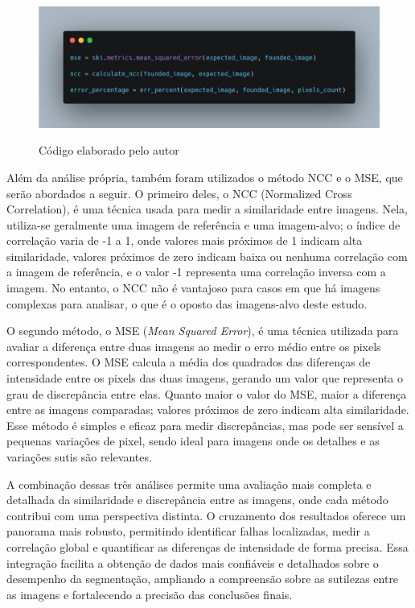 \FloatBarrier
\begin{figure}[ht]
    \caption{Código elaborado pelo autor}
    \centering
    \includegraphics[scale=0.25]{imagens/code_part_three.png}
    \label{fig:code3}
\end{figure}
\FloatBarrier

Além da análise própria, também foram utilizados o método NCC e o MSE, que serão abordados a seguir. O primeiro deles, o NCC (Normalized Cross Correlation), é uma técnica usada para medir a similaridade entre imagens. Nela, utiliza-se geralmente uma imagem de referência e uma imagem-alvo; o índice de correlação varia de -1 a 1, onde valores mais próximos de 1 indicam alta similaridade, valores próximos de zero indicam baixa ou nenhuma correlação com a imagem de referência, e o valor -1 representa uma correlação inversa com a imagem. No entanto, o NCC não é vantajoso para casos em que há imagens complexas para analisar, o que é o oposto das imagens-alvo deste estudo.

O segundo método, o MSE (\textit{Mean Squared Error}), é uma técnica utilizada para avaliar a diferença entre duas imagens ao medir o erro médio entre os pixels correspondentes. O MSE calcula a média dos quadrados das diferenças de intensidade entre os pixels das duas imagens, gerando um valor que representa o grau de discrepância entre elas. Quanto maior o valor do MSE, maior a diferença entre as imagens comparadas; valores próximos de zero indicam alta similaridade. Esse método é simples e eficaz para medir discrepâncias, mas pode ser sensível a pequenas variações de pixel, sendo ideal para imagens onde os detalhes e as variações sutis são relevantes.

A combinação dessas três análises permite uma avaliação mais completa e detalhada da similaridade e discrepância entre as imagens, onde cada método contribui com uma perspectiva distinta. O cruzamento dos resultados oferece um panorama mais robusto, permitindo identificar falhas localizadas, medir a correlação global e quantificar as diferenças de intensidade de forma precisa. Essa integração facilita a obtenção de dados mais confiáveis e detalhados sobre o desempenho da segmentação, ampliando a compreensão sobre as sutilezas entre as imagens e fortalecendo a precisão das conclusões finais.

